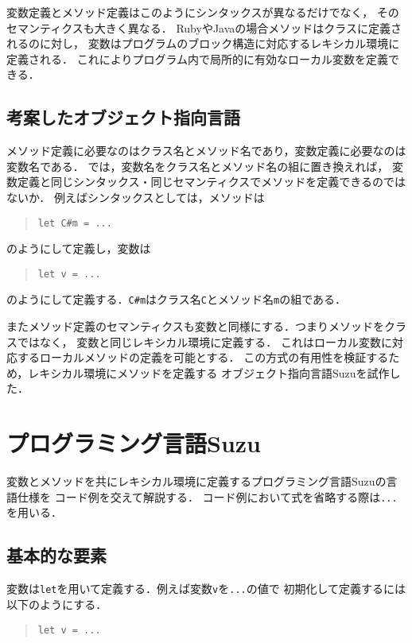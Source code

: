 \documentclass[a4paper,11pt,dvipdfmx]{jreport}
\begin{document}
変数定義とメソッド定義はこのようにシンタックスが異なるだけでなく，
そのセマンティクスも大きく異なる．
RubyやJavaの場合メソッドはクラスに定義されるのに対し，
変数はプログラムのブロック構造に対応するレキシカル環境に定義される．
これによりプログラム内で局所的に有効なローカル変数を定義できる．

\section{考案したオブジェクト指向言語}

メソッド定義に必要なのはクラス名とメソッド名であり，変数定義に必要なのは変数名である．
では，変数名をクラス名とメソッド名の組に置き換えれば，
変数定義と同じシンタックス・同じセマンティクスでメソッドを定義できるのではないか．
例えばシンタックスとしては，メソッドは
\begin{quote}
\begin{verbatim}
let C#m = ...
\end{verbatim}
\end{quote}
のようにして定義し，変数は
\begin{quote}
\begin{verbatim}
let v = ...
\end{verbatim}
\end{quote}
のようにして定義する．\verb|C#m|はクラス名\verb|C|とメソッド名\verb|m|の組である．

またメソッド定義のセマンティクスも変数と同様にする．つまりメソッドをクラスではなく，
変数と同じレキシカル環境に定義する．
これはローカル変数に対応するローカルメソッドの定義を可能とする．
この方式の有用性を検証するため，レキシカル環境にメソッドを定義する
オブジェクト指向言語Suzuを試作した．


\chapter{プログラミング言語Suzu}
\label{chapter:implementation}

変数とメソッドを共にレキシカル環境に定義するプログラミング言語Suzuの言語仕様を
コード例を交えて解説する．
コード例において式を省略する際は\verb|...|を用いる．

\section{基本的な要素}

変数は\verb|let|を用いて定義する．例えば変数\verb|v|を\verb|...|の値で
初期化して定義するには以下のようにする．
\begin{quote}
\begin{verbatim}
let v = ...
\end{verbatim}
\end{quote}
\end{document}
